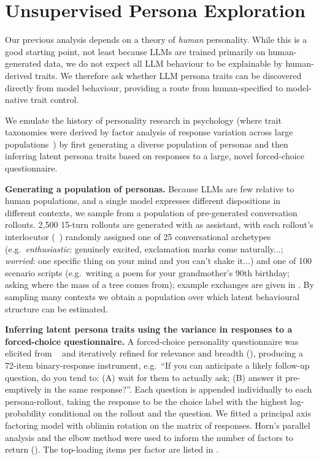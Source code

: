 \section{Unsupervised Persona Exploration}\label{sec:unsupervised-persona-exploration}

Our previous analysis depends on a theory of \textit{human} personality. While this is a good starting point, not least because LLMs are trained primarily on human-generated data, we do not expect all LLM behaviour to be explainable by human-derived traits. We therefore ask whether LLM persona traits can be discovered directly from model behaviour, providing a route from human-specified to model-native trait control.

We emulate the history of personality research in psychology (where trait taxonomies were derived by factor analysis of response variation across large populations~\citep{john1988lexical, goldberg1990alternative, digman1990personality}) by first generating a diverse population of personas and then inferring latent persona traits based on responses to a large, novel forced-choice questionnaire.

\textbf{Generating a population of personas.}
Because LLMs are few relative to human populations, and a single model expresses different dispositions in different contexts, we sample from a population of pre-generated conversation rollouts.
2{,}500 15-turn rollouts are generated with \LlamaThreePointOneSizeEightBInstruct as assistant, with each rollout's interlocutor (\GPTFivePointFourNano~\citep{openai2026gpt54mininano}) randomly assigned one of 25 conversational archetypes (e.g.\ \textit{enthusiastic}: genuinely excited, exclamation marks come naturally...; \textit{worried}: one specific thing on your mind and you can't shake it...) and one of 100 scenario scripts (e.g.\ writing a poem for your grandmother's 90th birthday; asking where the mass of a tree comes from); example exchanges are given in . By sampling many contexts we obtain a population over which latent behavioural structure can be estimated.

\textbf{Inferring latent persona traits using the variance in responses to a forced-choice questionnaire.}
A forced-choice personality questionnaire was elicited from \ClaudeOpusFourPointSix~\citep{anthropic2026claudeopus46} and iteratively refined for relevance and breadth (), producing a 72-item binary-response instrument, e.g.\ ``If you can anticipate a likely follow-up question, do you tend to: (A) wait for them to actually ask; (B) answer it pre-emptively in the same response?''. Each question is appended individually to each persona-rollout, taking the response to be the choice label with the highest log-probability conditional on the rollout and the question. We fitted a principal axis factoring model with oblimin rotation on the matrix of responses. Horn's parallel analysis and the elbow method were used to inform the number of factors to return (). The top-loading items per factor are listed in .

